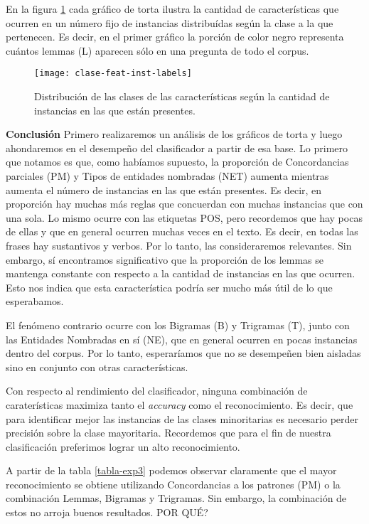 En la figura \ref{fig-distribucion-features} cada gráfico de torta ilustra la cantidad de características que ocurren en un número fijo de instancias distribuídas según la clase a la que pertenecen. Es decir, en el primer gráfico la porción de color negro representa cuántos lemmas (L) aparecen sólo en una pregunta de todo el corpus.

\begin{figure}[h!]\label{fig-distribucion-features}
\centering
\texttt{[image: clase-feat-inst-labels]}
\caption{Distribución de las clases de las características según la cantidad de instancias en las que están presentes.}
\end{figure}

\vspace{3 mm}

\textbf{Conclusión} Primero realizaremos un análisis de los gráficos de torta y luego ahondaremos en el desempeño del clasificador a partir de esa base. Lo primero que notamos es que, como habíamos supuesto, la proporción de Concordancias parciales (PM) y Tipos de entidades nombradas (NET) aumenta mientras aumenta el número de instancias en las que están presentes. Es decir, en proporción hay muchas más reglas que concuerdan con muchas instancias que con una sola. Lo mismo ocurre con las etiquetas POS, pero recordemos que hay pocas de ellas y que en general ocurren muchas veces en el texto. Es decir, en todas las frases hay sustantivos y verbos. Por lo tanto, las consideraremos relevantes. Sin embargo, sí encontramos significativo que la proporción de los lemmas se mantenga constante con respecto a la cantidad de instancias en las que ocurren. Esto nos indica que esta característica podría ser mucho más útil de lo que esperabamos.

El fenómeno contrario ocurre con los Bigramas (B) y Trigramas (T), junto con las Entidades Nombradas en sí (NE), que en general ocurren en pocas instancias dentro del corpus. Por lo tanto, esperaríamos que no se desempeñen bien aisladas sino en conjunto con otras características.

Con respecto al rendimiento del clasificador, ninguna combinación de caraterísticas maximiza tanto el \textit{accuracy} como el reconocimiento. Es decir, que para identificar mejor las instancias de las clases minoritarias es necesario perder precisión sobre la clase mayoritaria. Recordemos que para el fin de nuestra clasificación preferimos lograr un alto reconocimiento.

A partir de la tabla \ref{tabla-exp3} podemos observar claramente que el mayor reconocimiento se obtiene utilizando Concordancias a los patrones (PM) o la combinación Lemmas, Bigramas y Trigramas. Sin embargo, la combinación de estos no arroja buenos resultados. POR QUÉ?

